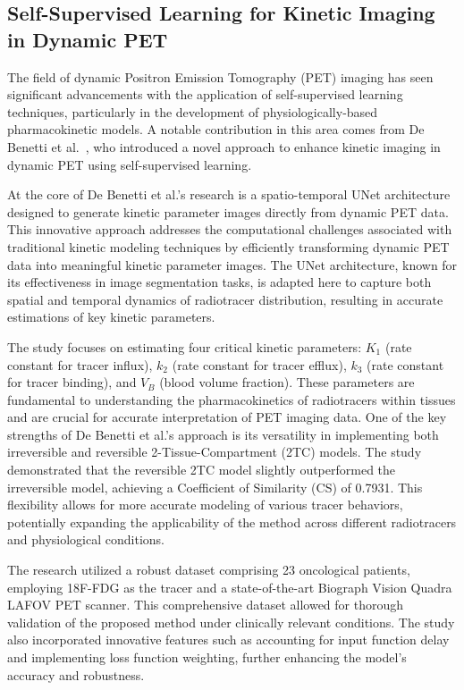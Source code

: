 \subsection{Self-Supervised Learning for Kinetic Imaging in Dynamic PET}
The field of dynamic Positron Emission Tomography (PET) imaging has seen significant advancements with the application of self-supervised learning techniques, particularly in the development of physiologically-based pharmacokinetic models. A notable contribution in this area comes from De Benetti et al.~\cite{debenetti2023}, who introduced a novel approach to enhance kinetic imaging in dynamic PET using self-supervised learning.

At the core of De Benetti et al.'s research is a spatio-temporal UNet architecture designed to generate kinetic parameter images directly from dynamic PET data. This innovative approach addresses the computational challenges associated with traditional kinetic modeling techniques by efficiently transforming dynamic PET data into meaningful kinetic parameter images. The UNet architecture, known for its effectiveness in image segmentation tasks, is adapted here to capture both spatial and temporal dynamics of radiotracer distribution, resulting in accurate estimations of key kinetic parameters.

The study focuses on estimating four critical kinetic parameters: $K_1$ (rate constant for tracer influx), $k_2$ (rate constant for tracer efflux), $k_3$ (rate constant for tracer binding), and $V_B$ (blood volume fraction). These parameters are fundamental to understanding the pharmacokinetics of radiotracers within tissues and are crucial for accurate interpretation of PET imaging data.
One of the key strengths of De Benetti et al.'s approach is its versatility in implementing both irreversible and reversible 2-Tissue-Compartment (2TC) models. The study demonstrated that the reversible 2TC model slightly outperformed the irreversible model, achieving a Coefficient of Similarity (CS) of 0.7931. This flexibility allows for more accurate modeling of various tracer behaviors, potentially expanding the applicability of the method across different radiotracers and physiological conditions.

The research utilized a robust dataset comprising 23 oncological patients, employing 18F-FDG as the tracer and a state-of-the-art Biograph Vision Quadra LAFOV PET scanner. This comprehensive dataset allowed for thorough validation of the proposed method under clinically relevant conditions. The study also incorporated innovative features such as accounting for input function delay and implementing loss function weighting, further enhancing the model's accuracy and robustness.

